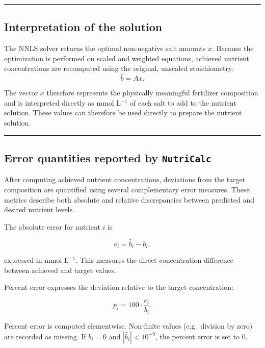 \documentclass[
  letterpaper,
  DIV=11,
  numbers=noendperiod]{scrreprt}
\begin{document}
\begin{center}\rule{0.5\linewidth}{0.5pt}\end{center}

\subsection{Interpretation of the
solution}\label{interpretation-of-the-solution}

The NNLS solver returns the optimal non-negative salt amounts \(x\).
Because the optimization is performed on scaled and weighted equations,
achieved nutrient concentrations are recomputed using the original,
unscaled stoichiometry: \[
\hat b = A x .
\]

The vector \(x\) therefore represents the physically meaningful
fertilizer composition and is interpreted directly as mmol L\(^{-1}\) of
each salt to add to the nutrient solution. These values can therefore be
used directly to prepare the nutrient solution.

\begin{center}\rule{0.5\linewidth}{0.5pt}\end{center}

\subsection{\texorpdfstring{Error quantities reported by
\texttt{NutriCalc}}{Error quantities reported by NutriCalc}}\label{error-quantities-reported-by-nutricalc}

After computing achieved nutrient concentrations, deviations from the
target composition are quantified using several complementary error
measures. These metrics describe both absolute and relative
discrepancies between predicted and desired nutrient levels.

The absolute error for nutrient \(i\) is

\[
e_i = \hat b_i - b_i ,
\]

expressed in mmol L\(^{-1}\). This measures the direct concentration
difference between achieved and target values.

Percent error expresses the deviation relative to the target
concentration:

\[
p_i = 100 \cdot \frac{e_i}{b_i}.
\]

Percent error is computed elementwise. Non-finite values (e.g.~division
by zero) are recorded as missing. If \(b_i = 0\) and
\(|\hat b_i| < 10^{-9}\), the percent error is set to \(0\).
\end{document}
